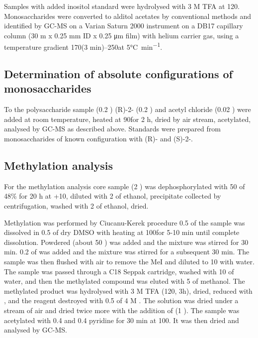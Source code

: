       Samples with added inositol standard were hydrolysed with 3 M \ac{TFA} at 120\cel. Monosaccharides
      were converted to alditol acetates by conventional methods and identified by \ac{GC-MS} on a
      Varian Saturn 2000 instrument on a DB17 capillary column (30 m x 0.25 \si{\milli\meter} ID x 0.25
      \si{\micro\meter} film) with helium carrier gas, using a temperature gradient 170\cel (3
      min)--250\cel at 5\si{\degreeCelsius\per\minute}.

      \subsection{Determination of absolute configurations of monosaccharides} %
      \label{sub:determination_of_absolute_configurations_of_monosaccharides}

      To the polysaccharide sample (0.2 \milligram) (R)-2- (0.2 \millilitre) and acetyl
      chloride (0.02 \millilitre) were added at room temperature, heated at 90\cel for 2 h, dried by air
      stream, acetylated, analysed by \ac{GC-MS} as described above. Standards were prepared from
      monosaccharides of known configuration with (R)- and (S)-2-.

      \subsection{Methylation analysis} %
      \label{sub:methylation_analysis}

      For the methylation analysis core sample (2 \milligram) was dephosphorylated with 50 \microlitre
      of 48\%  for 20 h at +10\cel, diluted with 2 \millilitre of ethanol, precipitate collected
      by centrifugation, washed with 2 \millilitre of ethanol, dried.

      Methylation was performed by Ciucanu-Kerek procedure 0.5 \milligram of
      the sample was dissolved in 0.5 \millilitre of dry DMSO with heating at 100\cel for 5-10 min until
      complete dissolution. Powdered  (about 50 \milligram) was added and the mixture was
      stirred for 30 min. 0.2 \millilitre of  was added and the mixture was stirred for a
      subsequent 30 min. The sample was then flushed with air to remove the MeI and diluted to 10
      \millilitre with water. The sample was passed through a C18 Seppak cartridge, washed with 10
      \millilitre of water, and then the methylated compound was eluted with 5 \millilitre of
      methanol. The methylated product was hydrolysed with 3 M \ac{TFA} (120\cel, 3h), dried, reduced
      with , and the reagent destroyed with 0.5 \millilitre of 4 M . The solution was
      dried under a stream of air and dried twice more with the addition of  (1
      \millilitre). The sample was acetylated with 0.4 \millilitre{}  and 0.4 \millilitre
      pyridine for 30 min at 100\cel. It was then dried and analysed by \ac{GC-MS}.

